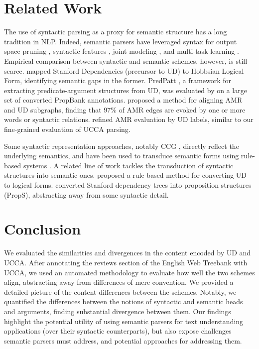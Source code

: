 \documentclass[11pt,a4paper,table]{article}
\begin{document}
\section{Related Work}\label{sec:related_work}

The use of syntactic parsing as a proxy for semantic structure has a long tradition in NLP.
Indeed, semantic parsers have leveraged syntax
for output space pruning \cite{xue2004calibrating}, 
syntactic features \cite{gildea2002automatic,hershcovich2017a}, 
joint modeling \cite{surdeanu2008conll,hajivc2009conll}, and
multi-task learning \cite{swayamdipta2016greedy,swayamdipta2018syntactic,hershcovich2018multitask}.
Empirical comparison between syntactic and semantic schemes, however,
is still scarce.
 mapped Stanford Dependencies
(precursor to UD) to Hobbsian Logical Form, identifying semantic gaps in the former.
PredPatt \citep{white2016universal},
a framework for extracting predicate-argument structures from UD,
was evaluated by 
on a large set of converted PropBank annotations.
 proposed a method for aligning AMR and UD subgraphs,
finding that 97\% of AMR edges are evoked by one or more
words or syntactic relations.
 refined AMR evaluation by UD labels,
similar to our fine-grained evaluation of UCCA parsing.

Some syntactic representation approaches, notably CCG \cite{Steedman:00},
directly reflect the underlying semantics, and have been used to
transduce semantic forms using rule-based systems \cite{Basile:12}.
A related line of work tackles the transduction of syntactic structures into semantic ones.
 proposed a rule-based method for converting UD
to logical forms.
 converted Stanford dependency trees into
proposition structures ({\sc PropS}), abstracting away from some syntactic detail.

\section{Conclusion}\label{sec:conclusion}

We evaluated the similarities and divergences in the content encoded by UD and UCCA. 
After annotating the reviews section of the English Web Treebank with UCCA,
  we used an automated methodology to evaluate how well the two schemes align,
  abstracting away from differences of mere convention.
We provided a detailed picture of the content differences between the schemes.
Notably, we quantified the differences between the notions of syntactic and semantic heads
  and arguments, finding substantial divergence between them.
Our findings highlight the potential utility of using semantic parsers for text understanding applications
  (over their syntactic counterparts), but also expose challenges semantic parsers must address,
  and potential approaches for addressing them.
\end{document}
